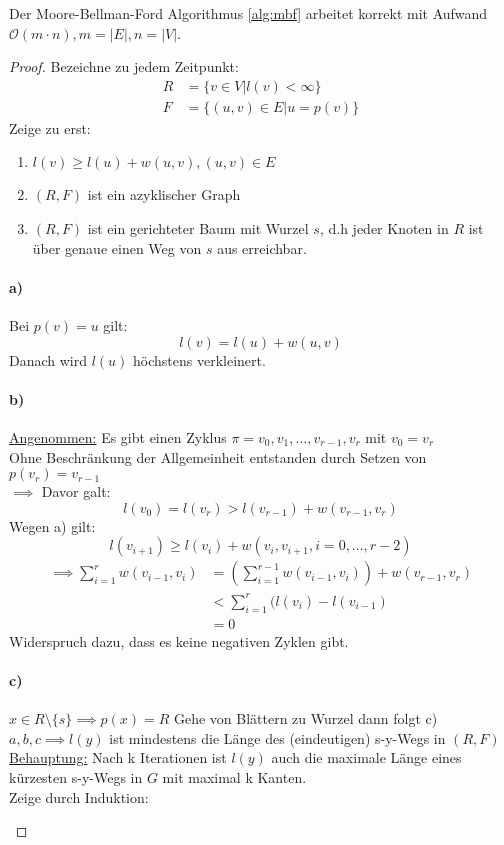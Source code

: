 \begin{theorem}
	Der Moore-Bellman-Ford Algorithmus \ref{alg:mbf} arbeitet korrekt mit Aufwand $\mathcal{O}(m \cdot n), m =|E|, n=|V|$. 
\end{theorem}
\begin{proof} 
Bezeichne zu jedem Zeitpunkt:
\begin{align*}
	R &= \{v \in V | l(v) < \infty\} \\
	F &= \{(u,v) \in E | u = p(v)\} 
\end{align*}
Zeige zu erst:
\begin{enumerate}
	\item $l(v) \ge l(u) + w(u,v), (u,v) \in E$ 
	\item $(R,F)$  ist ein azyklischer Graph
	\item $(R,F)$ ist ein gerichteter Baum mit Wurzel $s$, d.h jeder Knoten in $R$ ist über genaue einen Weg von $s$ aus erreichbar.
\end{enumerate}
\paragraph{a)} Bei $p(v)=u$ gilt:
\[
l(v)=l(u)+w(u,v)
\]
Danach wird $l(u)$ höchstens verkleinert.
\paragraph{b)}
\underline{Angenommen:} Es gibt einen Zyklus $\pi=v_0,v_1,\ldots,v_{r-1},v_r$ mit $v_0=v_r$ \\
Ohne Beschränkung der Allgemeinheit entstanden durch Setzen von $p(v_r)=v_{r-1}$ \\
$\implies$ Davor galt:
\[
l(v_0)=l(v_r) > l(v_{r-1}) + w(v_{r-1},v_r)
\]
Wegen a) gilt:
\[
l(v_{i+1}) \ge l(v_i) +w(v_i, v_{i+1}, i=0,\ldots,r-2)
\]
\begin{align*}
	\implies \sum_{i=1}^{r}w(v_{i-1},v_i) &= \left( \sum_{i=1}^{r-1}w(v_{i-1},v_i) \right)+ w(v_{r-1},v_r) \\
					      &< \sum_{i=1}^{r}(l(v_i)-l(v_{i-1}) \\
					      &=0
\end{align*}
Widerspruch dazu, dass es keine negativen Zyklen gibt.

\paragraph{c)}
$x \in R \setminus \{s\} \implies p(x)=R$ Gehe von Blättern zu Wurzel dann folgt c)\\
$a,b,c \implies l(y)$ ist mindestens die Länge des (eindeutigen) s-y-Wegs in $(R,F)$ \\
\underline{Behauptung:} Nach k Iterationen ist $l(y)$ auch die maximale Länge eines kürzesten s-y-Wegs in $G$ mit maximal k Kanten.\\
Zeige durch Induktion:
\begin{itemize}[label=$\lozenge$, itemsep=2ex]


\end{itemize}
\end{proof}
